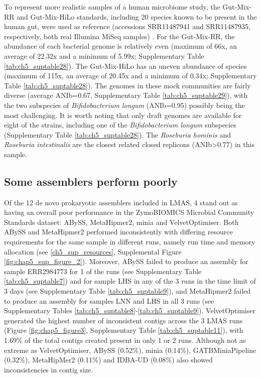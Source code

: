 To represent more realistic samples of a human microbiome study, the Gut-Mix-RR and Gut-Mix-HiLo standards, including 20 species known to be present in the human gut, were used as reference (accessions SRR11487941 and SRR11487935, respectively, both real Illumina MiSeq samples) \cite{amos_developing_2020}. For the Gut-Mix-RR, the abundance of each bacterial genome is relatively even (maximum of 66x, an average of 22.32x and a minimum of 5.99x; Supplementary Table \ref{tab:ch5_suptable28}). The Gut-Mix-HiLo has an uneven abundance of species (maximum of 115x, an average of 20.45x and a minimum of 0.34x; Supplementary Table \ref{tab:ch5_suptable28}). The genomes in these mock communities are fairly diverse (average ANIb=0.67, Supplementary Table \ref{tab:ch5_suptable29}), with the two subspecies of \textit{Bifidobacterium longum} (ANIb=0.95) possibly being the most challenging. It is worth noting that only draft genomes are available for eight of the strains, including one of the \textit{Bifidobacterium longum} subspecies (Supplementary Table \ref{tab:ch5_suptable28}). The \textit{Roseburia hominis} and \textit{Roseburia intestinalis} are the closest related closed replicons (ANIb>0.77) in this sample.

\subsection{Some assemblers perform poorly}

Of the 12 de novo prokaryotic assemblers included in LMAS, 4 stand out as having an overall poor performance in the ZymoBIOMICS Microbial Community Standards dataset: ABySS, MetaHipmer2, minia and VelvetOptimiser. Both ABySS and MetaHipmer2 performed inconsistently with differing resource requirements for the same sample in different runs, namely run time and memory allocation (see \ref{ch5_sup_resources}, Supplemental Figure \ref{fig:chap5_sup_figure_2}).  Moreover, ABySS failed to produce an assembly for sample ERR2984773 for 1 of the runs (see Supplementary Table \ref{tab:ch5_suptable7}) and for sample LHS in any of the 3 runs in the time limit of 3 days (see Supplementary Table \ref{tab:ch5_suptable9}), and MetaHipmer2 failed to produce an assembly for samples LNN and LHS in all 3 runs (see Supplementary Tables \ref{tab:ch5_suptable8}-\ref{tab:ch5_suptable9}). VelvetOptimiser generated the highest number of inconsistent contigs across the 3 LMAS runs (Figure \ref{fig:chap5_figure3}, Supplementary Table \ref{tab:ch5_suptable11}), with 1.69\% of the total contigs created present in only 1 or 2 runs. Although not as extreme as VelvetOptimiser, ABySS (0.52\%), minia (0.14\%), GATBMiniaPipeline (0.32\%), MetaHipMer2 (0.11\%) and IDBA-UD (0.08\%) also showed inconsistencies in contig size.

